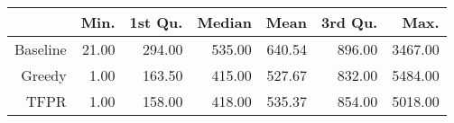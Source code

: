 \begin{table}[ht]
\centering
\begin{tabular}{rrrrrrr}
  \hline
 & Min. & 1st Qu. & Median & Mean & 3rd Qu. & Max. \\ 
  \hline
Baseline & 21.00 & 294.00 & 535.00 & 640.54 & 896.00 & 3467.00 \\ 
  Greedy & 1.00 & 163.50 & 415.00 & 527.67 & 832.00 & 5484.00 \\ 
  TFPR & 1.00 & 158.00 & 418.00 & 535.37 & 854.00 & 5018.00 \\ 
   \hline
\end{tabular}
\end{table}

